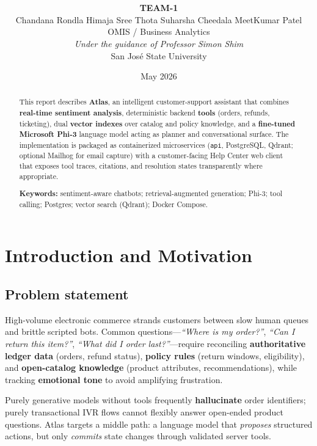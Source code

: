 \documentclass[11pt,a4paper,twoside]{report}
\title{\projtitle\\[0.6em]\large \projsubtitle}
\author{\textbf{TEAM-1}\\ Chandana Rondla \quad Himaja Sree Thota \quad Suharsha Cheedala \quad MeetKumar Patel\\[0.8em]
\small OMIS / Business Analytics\\
\textit{Under the guidance of Professor Simon Shim}\\[0.4em]
San Jos\'e State University}
\date{May 2026}
\begin{document}
\maketitle

\begin{abstract}
\noindent
This report describes \textbf{Atlas}, an intelligent customer-support assistant that combines \textbf{real-time sentiment analysis}, deterministic backend \textbf{tools} (orders, refunds, ticketing), dual \textbf{vector indexes} over catalog and policy knowledge, and a \textbf{fine-tuned Microsoft Phi-3} language model acting as planner and conversational surface.
The implementation is packaged as containerized microservices (\texttt{api}, PostgreSQL, Qdrant; optional Mailhog for email capture) with a customer-facing Help Center web client that exposes tool traces, citations, and resolution states transparently where appropriate.

\vspace{0.6em}\noindent\textbf{Keywords:} sentiment-aware chatbots; retrieval-augmented generation; Phi-3; tool calling; Postgres; vector search (Qdrant); Docker Compose.

\end{abstract}

\tableofcontents
\listoffigures
\newpage

\chapter{Introduction and Motivation}

\section{Problem statement}
\label{sec:problem}
High-volume electronic commerce strands customers between slow human queues and brittle scripted bots.
Common questions—\emph{``Where is my order?''}, \emph{``Can I return this item?''}, \emph{``What did I order last?''}—require reconciling \textbf{authoritative ledger data} (orders, refund status), \textbf{policy rules} (return windows, eligibility), and \textbf{open-catalog knowledge} (product attributes, recommendations), while tracking \textbf{emotional tone} to avoid amplifying frustration.

Purely generative models without tools frequently \textbf{hallucinate} order identifiers; purely transactional IVR flows cannot flexibly answer open-ended product questions.
Atlas targets a middle path: a language model that \emph{proposes} structured actions, but only \emph{commits} state changes through validated server tools.
\end{document}
